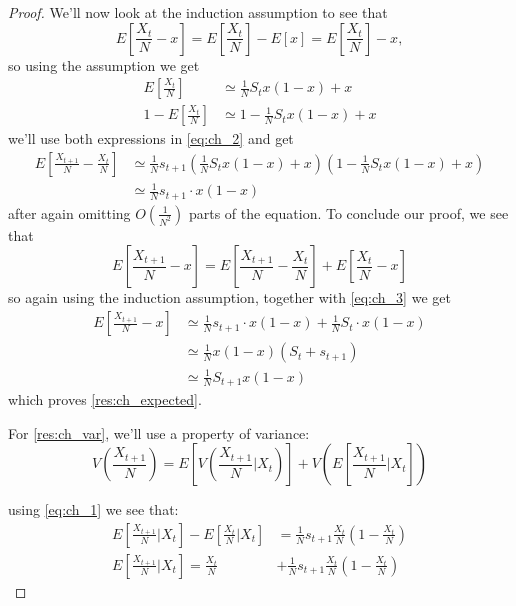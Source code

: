 \documentclass[12pt]{extarticle}
\begin{document}
\begin{proof}
We'll now look at the induction assumption to see that
\begin{equation}
E\left[\frac{X_t}{N}-x\right]=E\left[\frac{X_t}{N}\right]-E[x]=E\left[\frac{X_t}{N}\right]-x ,
\end{equation}
so using the assumption we get
\begin{equation}
\begin{split}
E\left[\frac{X_t}{N}\right] &\simeq \frac{1}{N} S_t x(1-x)+x \\
1 - E\left[\frac{X_t}{N}\right] &\simeq 1- \frac{1}{N} S_t x(1-x)+x
\end{split}
\end{equation}
we'll use both expressions in \cref{eq:ch_2} and get
\begin{equation}\label{eq:ch_3}
\begin{split}
E\left[\frac{X_{t+1}}{N}-\frac{X_t}{N}\right] &\simeq \frac{1}{N}s_{t+1} \left(\frac{1}{N} S_t x(1-x)+x \right)\left(1- \frac{1}{N} S_t x(1-x)+x \right) \\
&\simeq  \frac{1}{N}s_{t+1}\cdot x(1-x)
\end{split}
\end{equation}
after again omitting $O(\frac{1}{N^2})$ parts of the equation.
To conclude our proof, we see that
\begin{equation}
E\left[\frac{X_{t+1}}{N}-x\right] = E\left[\frac{X_{t+1}}{N}-\frac{X_t}{N}\right] + E\left[\frac{X_t}{N}-x\right]
\end{equation}
so again using the induction assumption, together with \cref{eq:ch_3} we get
\begin{equation}
\begin{split}
E\left[\frac{X_{t+1}}{N}-x\right] &\simeq \frac{1}{N}s_{t+1}\cdot x(1-x) + \frac{1}{N}S_t\cdot x(1-x) \\
& \simeq \frac{1}{N}x(1-x)(S_t + s_{t+1}) \\
& \simeq \frac{1}{N} S_{t+1} x(1-x)
\end{split}
\end{equation}
which proves \cref{res:ch_expected}.

For \cref{res:ch_var}, we'll use a property of variance:
\begin{equation}\label{eq:ch_var}
V\left(\frac{X_{t+1}}{N}\right) = E\left[V\left(\frac{X_{t+1}}{N} \bigg|X_t \right)\right] + V\left(E\left[\frac{X_{t+1}}{N} \bigg|X_t \right]\right)
\end{equation}

using \cref{eq:ch_1} we see that:
\begin{equation}\label{eq:ch_var1}
\begin{split}
E\left[\frac{X_{t+1}}{N} \bigg|X_t \right] - E\left[\frac{X_{t}}{N} \bigg|X_t \right] &= \frac{1}{N}s_{t+1}\frac{X_t}{N}\left(1-\frac{X_t}{N} \right) \\
E\left[\frac{X_{t+1}}{N} \bigg|X_t \right] = \frac{X_t}{N} &+ \frac{1}{N}s_{t+1}\frac{X_t}{N}\left(1-\frac{X_t}{N} \right)
\end{split}
\end{equation}


\end{proof}
\end{document}
